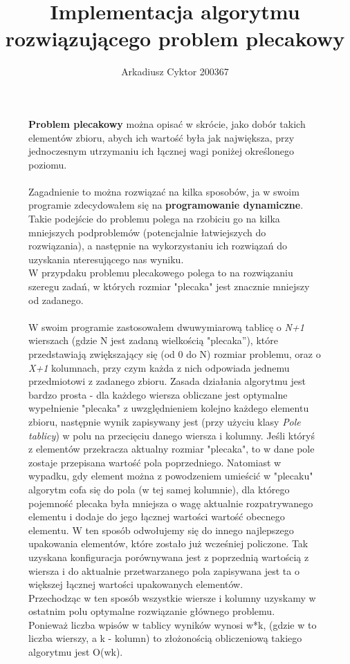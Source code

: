 \documentclass[a4paper,11pt]{report}
\title{Implementacja algorytmu rozwiązującego problem plecakowy}
\author{Arkadiusz Cyktor 200367}
\begin{document}
\maketitle


\begin{figure}
  \textbf{Problem plecakowy} można opisać w skrócie, jako dobór takich elementów zbioru, abych ich wartość była jak największa, przy jednoczesnym utrzymaniu ich łącznej wagi poniżej określonego poziomu.
\\
\\Zagadnienie to można rozwiązać na kilka sposobów, ja w swoim programie zdecydowałem się na \textbf{programowanie dynamiczne}. Takie podejście do problemu polega na rzobiciu go na kilka mniejszych podproblemów (potencjalnie łatwiejszych do rozwiązania), a następnie na wykorzystaniu ich rozwiązań do uzyskania nteresującego nas wyniku.
\\W przypdaku problemu plecakowego polega to na rozwiązaniu szeregu zadań, w których rozmiar "plecaka" jest znacznie mniejszy od zadanego.
\\
\\W swoim programie zastosowałem dwuwymiarową tablicę o \emph{N+1} wierszach (gdzie N jest zadaną wielkością "plecaka''), które przedstawiają zwiększający się (od 0 do N) rozmiar problemu, oraz o \emph{X+1} kolumnach, przy czym każda z nich odpowiada jednemu przedmiotowi z zadanego zbioru. Zasada działania algorytmu jest bardzo prosta - dla każdego wiersza obliczane jest optymalne wypełnienie "plecaka" z uwzględnieniem kolejno każdego elementu zbioru, następnie wynik zapisywany jest (przy użyciu klasy \emph{Pole\underline{ }tablicy}) w polu na przecięciu danego wiersza i kolumny. Jeśli któryś z elementów przekracza aktualny rozmiar "plecaka", to w dane pole zostaje przepisana wartość pola poprzedniego. Natomiast w wypadku, gdy element można z powodzeniem umieścić w "plecaku" algorytm cofa się do pola (w tej samej kolumnie), dla którego pojemność plecaka była mniejsza o wagę aktualnie rozpatrywanego elementu i dodaje do jego łącznej wartości wartość obecnego elementu. W ten sposób odwołujemy się do innego najlepszego upakowania elementów, które zostało już wcześniej policzone. Tak uzyskana konfiguracja porównywana jest z poprzednią wartością z wiersza i do aktualnie przetwarzanego pola zapisywana jest ta o większej łącznej wartości upakowanych elementów.
\\Przechodząc w ten sposób wszystkie wiersze i kolumny uzyskamy w ostatnim polu optymalne rozwiązanie głównego problemu.
\\Ponieważ liczba wpisów w tablicy wyników wynosi w*k, (gdzie w to liczba wierszy, a k - kolumn) to złożonością obliczeniową takiego algorytmu jest O(wk).
\end{figure}
\end{document}
